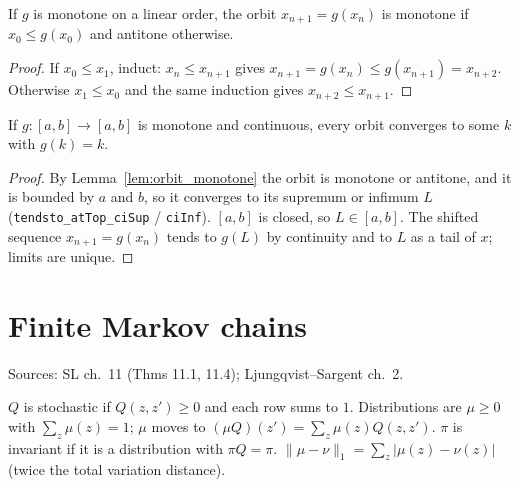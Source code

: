 \begin{lemma}
\label{lem:orbit_monotone}
\leanok
{}
If $g$ is monotone on a linear order, the orbit $x_{n+1} = g(x_n)$ is monotone if $x_0 \le g(x_0)$ and antitone
otherwise.
\end{lemma}
\begin{proof}
\leanok
If $x_0 \le x_1$, induct: $x_n \le x_{n+1}$ gives $x_{n+1} = g(x_n) \le g(x_{n+1}) = x_{n+2}$. Otherwise
$x_1 \le x_0$ and the same induction gives $x_{n+2} \le x_{n+1}$.
\end{proof}

\begin{theorem}
\label{thm:orbit_tendsto_fixedPoint}
\leanok
{}
If $g : [a, b] \to [a, b]$ is monotone and continuous, every orbit converges to some $k$ with $g(k) = k$.
\end{theorem}
\begin{proof}
\leanok
By Lemma~\ref{lem:orbit_monotone} the orbit is monotone or antitone, and it is bounded by $a$ and $b$, so it converges
to its supremum or infimum $L$ (\texttt{tendsto\_atTop\_ciSup} / \texttt{ciInf}). $[a, b]$ is closed, so $L \in [a, b]$.
The shifted sequence $x_{n+1} = g(x_n)$ tends to $g(L)$ by continuity and to $L$ as a tail of $x$; limits are unique.
\end{proof}

\section{Finite Markov chains}
\label{sec:markov}

Sources: SL ch.~11 (Thms 11.1, 11.4); Ljungqvist--Sargent ch.~2.

\begin{definition}
\label{def:markov}
\leanok
$Q$ is stochastic if $Q(z, z') \ge 0$ and each row sums to $1$. Distributions are $\mu \ge 0$ with $\sum_z \mu(z) = 1$;
$\mu$ moves to $(\mu Q)(z') = \sum_z \mu(z) Q(z, z')$. $\pi$ is invariant if it is a distribution with $\pi Q = \pi$.
$\|\mu - \nu\|_1 = \sum_z |\mu(z) - \nu(z)|$ (twice the total variation distance).
\end{definition}


